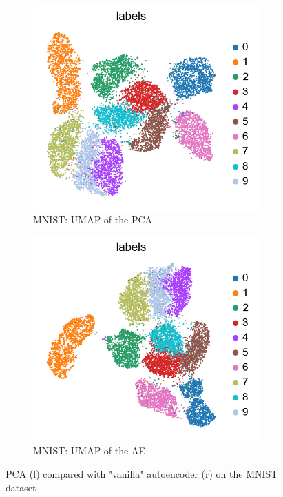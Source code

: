 \documentclass[11pt, a4paper]{report}
\theoremstyle{plain}
\theoremstyle{definition}
\theoremstyle{remark}
\begin{document}
\begin{figure}[!h]
\begin{framed}
\centering
\begin{subfigure}[t]{0.45\textwidth}
\includegraphics[width=0.95\textwidth]{images/pca.umap.mnist.png}
\caption{MNIST: UMAP of the PCA}
\end{subfigure}
\begin{subfigure}[t]{0.45\textwidth}
\includegraphics[width=0.95\textwidth]{images/ae.umap.mnist.png}
\caption{MNIST: UMAP of the AE}
\end{subfigure}
\end{framed}
\caption{PCA (l) compared with "vanilla" autoencoder (r) on the MNIST dataset}
\label{fig:pcavae}
\end{figure}
\end{document}

